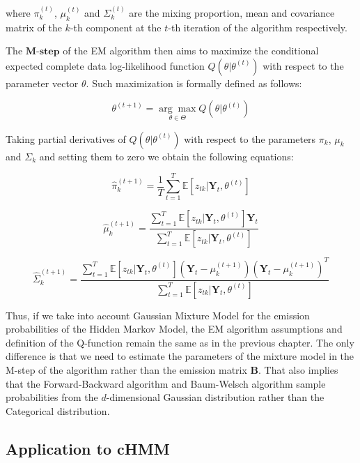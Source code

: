 where $\pi_k^{(t)}$, $\mu_k^{(t)}$ and $\Sigma_k^{(t)}$ are the mixing proportion, mean and covariance matrix of the $k$-th component at the $t$-th iteration of the algorithm respectively.

The $\textbf{M-step}$ of the EM algorithm then aims to maximize the conditional expected complete data log-likelihood function $Q(\theta|\theta^{(t)})$ with respect to the parameter vector $\theta$.
Such maximization is formally defined as follows:

\begin{equation}
    \theta^{(t+1)} = \underset{\theta \in \Theta}{\arg\max} Q(\theta|\theta^{(t)})
\end{equation}

Taking partial derivatives of $Q(\theta|\theta^{(t)})$ with respect to the parameters $\pi_k$, $\mu_k$ and $\Sigma_k$ and setting them to zero we obtain the following equations:

\begin{equation}
    \hat{\pi}_k^{(t+1)} = \frac{1}{T} \sum_{t=1}^{T} \mathbb{E}[z_{tk}|\textbf{Y}_t,\theta^{(t)}]
\end{equation}

\begin{equation}
    \hat{\mu}_k^{(t+1)} = \frac{\sum_{t=1}^{T} \mathbb{E}[z_{tk}|\textbf{Y}_t,\theta^{(t)}] \textbf{Y}_t}{\sum_{t=1}^{T} \mathbb{E}[z_{tk}|\textbf{Y}_t,\theta^{(t)}]}
\end{equation}

\begin{equation} \label{eq:covariance_matrix}
    \hat{\Sigma}_k^{(t+1)} = \frac{\sum_{t=1}^{T} \mathbb{E}[z_{tk}|\textbf{Y}_t,\theta^{(t)}](\textbf{Y}_t - \mu_k^{(t+1)}){(\textbf{Y}_t - \mu_k^{(t+1)})}^T}{\sum_{t=1}^{T} \mathbb{E}[z_{tk}|\textbf{Y}_t,\theta^{(t)}]}
\end{equation}

\noindent Thus, if we take into account Gaussian Mixture Model for the emission probabilities of the Hidden Markov Model, the EM algorithm assumptions and definition of the Q-function remain 
the same as in the previous chapter. The only difference is that we need to estimate the parameters of the mixture model in the M-step of the algorithm rather than the emission matrix $\textbf{B}$. 
That also implies that the Forward-Backward algorithm and Baum-Welsch algorithm sample probabilities from the $d$-dimensional Gaussian distribution rather than the Categorical distribution.

\subsection{Application to cHMM}

